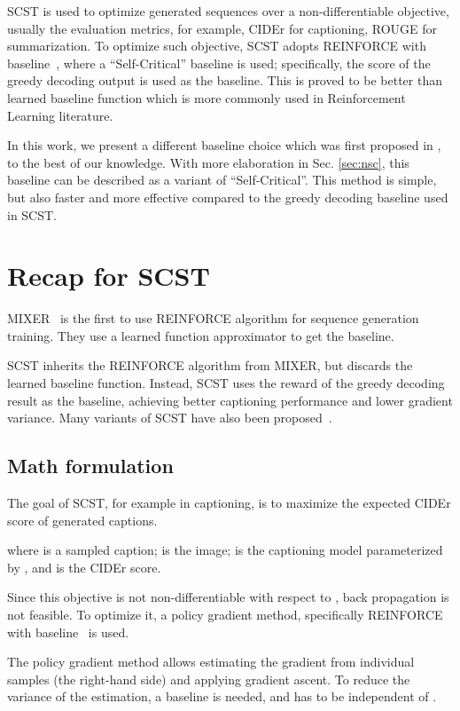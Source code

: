 \documentclass[11pt,a4paper]{article}
\begin{document}
SCST is used to optimize generated sequences over a non-differentiable objective, usually the evaluation metrics, for example, CIDEr for captioning, ROUGE for summarization. To optimize such objective, SCST adopts REINFORCE with baseline~\cite{williams1992simple}, where a ``Self-Critical'' baseline is used; specifically, the score of the greedy decoding output is used as the baseline. This is proved to be better than learned baseline function which is more commonly used in Reinforcement Learning literature.

In this work, we present a different baseline choice which was first proposed in \cite{mnih2016variational}, to the best of our knowledge. With more elaboration in Sec. \ref{sec:nsc}, this baseline can be described as a variant of ``Self-Critical''. This method is simple, but also faster and more effective compared to the greedy decoding baseline used in SCST.

\section{Recap for SCST}

MIXER~\cite{ranzato2015sequence} is the first to use REINFORCE algorithm for sequence generation training.
They use a learned function approximator to get the baseline.

SCST inherits the REINFORCE algorithm from MIXER, but discards the learned baseline function. Instead, SCST uses the reward of the greedy decoding result as the baseline, achieving better captioning performance and lower gradient variance. Many variants of SCST have also been proposed~\cite{anderson2018bottom,gao2019self,hu2017reinforced}.



\subsection{Math formulation}
The goal of SCST, for example in captioning, is to maximize the expected CIDEr score of generated captions.

where  is a sampled caption;  is the image;  is the captioning model parameterized by , and  is the CIDEr score.

Since this objective is not non-differentiable with respect to , back propagation is not feasible. To optimize it, a policy gradient method, specifically REINFORCE with baseline~\cite{williams1992simple} is used.


The policy gradient method allows estimating the gradient from individual samples (the right-hand side) and applying gradient ascent. To reduce the variance of the estimation, a baseline  is needed, and  has to be independent of .
\end{document}
